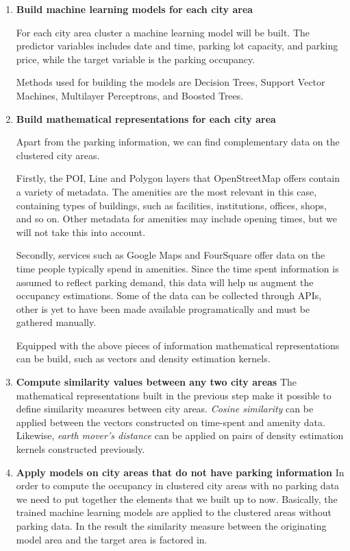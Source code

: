 \documentclass{ws-ijait}
\begin{document}
\begin{enumerate}[label=\Roman*]
		\item{\textbf{Build machine learning models for each city area}}
		
		For each city area cluster a machine learning model will be built. The predictor variables includes date and time, parking lot capacity, and parking price, while the target variable is the parking occupancy. 
		
		Methods used for building the models are Decision Trees, Support Vector Machines, Multilayer Perceptrons, and Boosted Trees.
		
		\item{\textbf{Build mathematical representations for each city area}}
		
		Apart from the parking information, we can find complementary data on the clustered city areas. 
		
		Firstly, the POI, Line and Polygon layers that OpenStreetMap offers contain a variety of metadata. The amenities are the most relevant in this case, containing types of buildings, such as facilities, institutions, offices, shops, and so on. Other metadata for amenities may include opening times, but we will not take this into account.
		
		Secondly, services such as Google Maps and FourSquare offer data on the time people typically spend in amenities. Since the time spent information is assumed to reflect parking demand, this data will help us augment the occupancy estimations. Some of the data can be collected through APIs, other is yet to have been made available programatically and must be gathered manually.
		
		Equipped with the above pieces of information mathematical representations can be build, such as vectors and density estimation kernels.  		
		
		\item{\textbf{Compute similarity values between any two city areas}}
		The mathematical representations built in the previous step make it possible to define similarity measures between city areas. \textit{Cosine similarity} can be applied between the vectors constructed on time-spent and amenity data. Likewise, \textit{earth mover's distance} can be applied on pairs of density estimation kernels constructed previously.
		
		\item{\textbf{Apply models on city areas that do not have parking information}}
		In order to compute the occupancy in clustered city areas with no parking data we need to put together the elements that we built up to now. Basically, the trained machine learning models are applied to the clustered areas without parking data. In the result the similarity measure between the originating model area and the target area is factored in.
		

\end{enumerate}
\end{document}
